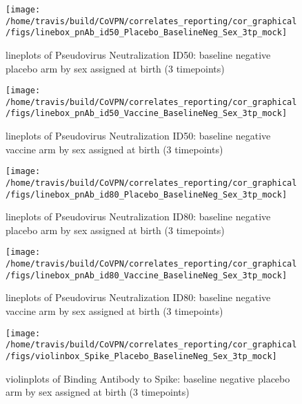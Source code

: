\documentclass[]{book}
\theoremstyle{definition}
\theoremstyle{definition}
\theoremstyle{definition}
\newcommand{\1}{\mathbbm{1}}
\begin{document}
\clearpage
\begin{figure}[H]

{\centering \texttt{[image: /home/travis/build/CoVPN/correlates\_reporting/cor\_graphical/figs/linebox\_pnAb\_id50\_Placebo\_BaselineNeg\_Sex\_3tp\_mock]} 

}

\caption{lineplots of Pseudovirus Neutralization ID50: baseline negative placebo arm by sex assigned at birth (3 timepoints)}\label{fig:unnamed-chunk-175}
\end{figure}

\clearpage
\begin{figure}[H]

{\centering \texttt{[image: /home/travis/build/CoVPN/correlates\_reporting/cor\_graphical/figs/linebox\_pnAb\_id50\_Vaccine\_BaselineNeg\_Sex\_3tp\_mock]} 

}

\caption{lineplots of Pseudovirus Neutralization ID50: baseline negative vaccine arm by sex assigned at birth (3 timepoints)}\label{fig:unnamed-chunk-176}
\end{figure}

\clearpage
\begin{figure}[H]

{\centering \texttt{[image: /home/travis/build/CoVPN/correlates\_reporting/cor\_graphical/figs/linebox\_pnAb\_id80\_Placebo\_BaselineNeg\_Sex\_3tp\_mock]} 

}

\caption{lineplots of Pseudovirus Neutralization ID80: baseline negative placebo arm by sex assigned at birth (3 timepoints)}\label{fig:unnamed-chunk-177}
\end{figure}

\clearpage
\begin{figure}[H]

{\centering \texttt{[image: /home/travis/build/CoVPN/correlates\_reporting/cor\_graphical/figs/linebox\_pnAb\_id80\_Vaccine\_BaselineNeg\_Sex\_3tp\_mock]} 

}

\caption{lineplots of Pseudovirus Neutralization ID80: baseline negative vaccine arm by sex assigned at birth (3 timepoints)}\label{fig:unnamed-chunk-178}
\end{figure}

\clearpage
\begin{figure}[H]

{\centering \texttt{[image: /home/travis/build/CoVPN/correlates\_reporting/cor\_graphical/figs/violinbox\_Spike\_Placebo\_BaselineNeg\_Sex\_3tp\_mock]} 

}

\caption{violinplots of Binding Antibody to Spike: baseline negative placebo arm by sex assigned at birth (3 timepoints)}\label{fig:unnamed-chunk-179}
\end{figure}
\end{document}
